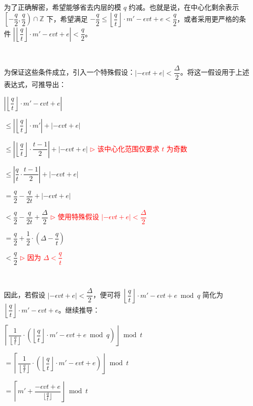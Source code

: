 为了正确解密，希望能够省去内层的模 $q$ 约减。也就是说，在中心化剩余表示 $\left[-\dfrac{q}{2}, \dfrac{q}{2}\right)\cap\mathbb Z$ 下，希望满足 $-\dfrac{q}{2} \leq \left\lfloor\dfrac{q}{t}\right\rfloor\cdot m'  - \epsilon vt + e < \dfrac{q}{2}$，或者采用更严格的条件 $\left|\left\lfloor\dfrac{q}{t}\right\rfloor\cdot m'  - \epsilon vt + e\right| < \dfrac{q}{2}$。

$ $

为保证这些条件成立，引入一个特殊假设：$|-\epsilon vt + e| < \dfrac{\Delta}{2}$。将这一假设用于上述表达式，可推导出：

$\left|\left\lfloor\dfrac{q}{t}\right\rfloor\cdot m'  - \epsilon vt + e\right| $

$ \leq \left|\left\lfloor\dfrac{q}{t}\right\rfloor\cdot m'\right| + \left|- \epsilon vt + e\right|$

$ \leq \left|\left\lfloor\dfrac{q}{t}\right\rfloor\cdot \dfrac{t-1}{2}\right| + \left|- \epsilon vt + e\right|$ \textcolor{red}{ $\rhd$ 该中心化范围仅要求 $t$ 为奇数}

$ \leq \left|\dfrac{q}{t}\cdot \dfrac{t-1}{2}\right| + \left|- \epsilon vt + e\right|$

$ = \dfrac{q}{2} - \dfrac{q}{2t} + \left|- \epsilon vt + e\right|$

$ < \dfrac{q}{2} - \dfrac{q}{2t} + \dfrac{\Delta}{2}$ \textcolor{red}{ $\rhd$ 使用特殊假设 $|-\epsilon vt + e| < \dfrac{\Delta}{2}$}

$ = \dfrac{q}{2} + \dfrac{1}{2}\cdot \left(\Delta - \dfrac{q}{t}\right)$

$< \dfrac{q}{2}$ \textcolor{red}{ $\rhd$ 因为 $\Delta < \dfrac{q}{t}$}


$ $

因此，若假设 $|-\epsilon vt + e| < \dfrac{\Delta}{2}$，便可将 $\left\lfloor\dfrac{q}{t}\right\rfloor\cdot m'  - \epsilon vt + e \bmod q$ 简化为 $\left\lfloor\dfrac{q}{t}\right\rfloor\cdot m'  - \epsilon vt + e$。继续推导：


$\left\lceil\dfrac{1}{\left\lfloor\frac{q}{t}\right\rfloor} \cdot \left(\left\lfloor\dfrac{q}{t}\right\rfloor\cdot m'  - \epsilon vt + e \bmod q \right)\right\rfloor \bmod t$ 

$= \left\lceil\dfrac{1}{\left\lfloor\frac{q}{t}\right\rfloor} \cdot \left(\left\lfloor\dfrac{q}{t}\right\rfloor\cdot m'  - \epsilon vt + e \right)\right\rfloor \bmod t$ 



$= \left\lceil m' + \dfrac{-\epsilon  vt + e  }{\lfloor\frac{q}{t}\rfloor} \right\rfloor \bmod t$ 

